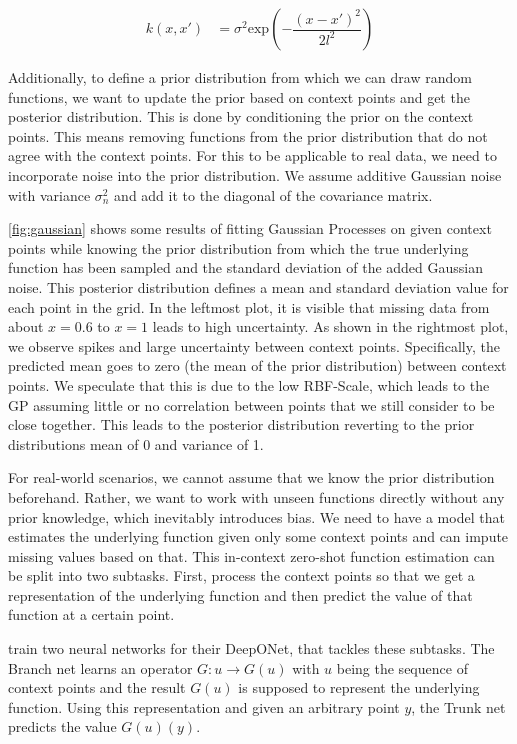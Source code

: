 \begin{align}
k(x,x') &= \sigma^2\text{exp}\left(-\dfrac{(x-x')^2}{2l^2}\right) \label{eq:rbf}
\end{align}

Additionally, to define a prior distribution from which we can draw random functions, we want to update the prior based on context points and get the posterior distribution. This is done by conditioning the prior on the context points. This means removing functions from the prior distribution that do not agree with the context points. For this to be applicable to real data, we need to incorporate noise into the prior distribution. We assume additive Gaussian noise with variance $\sigma_n^2$ and add it to the diagonal of the covariance matrix. \cite{williams2006gaussian}

\autoref{fig:gaussian} shows some results of fitting Gaussian Processes on given context points while knowing the prior distribution from which the true underlying function has been sampled and the standard deviation of the added Gaussian noise. This posterior distribution defines a mean and standard deviation value for each point in the grid. In the leftmost plot, it is visible that missing data from about $x=0.6$ to $x=1$ leads to high uncertainty. As shown in the rightmost plot, we observe spikes and large uncertainty between context points. Specifically, the predicted mean goes to zero (the mean of the prior distribution) between context points. We speculate that this is due to the low RBF-Scale, which leads to the GP assuming little or no correlation between points that we still consider to be close together. This leads to the posterior distribution reverting to the prior distributions mean of 0 and variance of 1.

For real-world scenarios, we cannot assume that we know the prior distribution beforehand. Rather, we want to work with unseen functions directly without any prior knowledge, which inevitably introduces bias. We need to have a model that estimates the underlying function given only some context points and can impute missing values based on that. This in-context zero-shot function estimation can be split into two subtasks. First, process the context points so that we get a representation of the underlying function and then predict the value of that function at a certain point.

\citet{Lu_2021} train two neural networks for their DeepONet, that tackles these subtasks. The Branch net learns an operator $G: u\rightarrow G(u)$ with $u$ being the sequence of context points and the result $G(u)$ is supposed to represent the underlying function. Using this representation and given an arbitrary point $y$, the Trunk net predicts the value $G(u)(y)$. \cite{Lu_2021}

